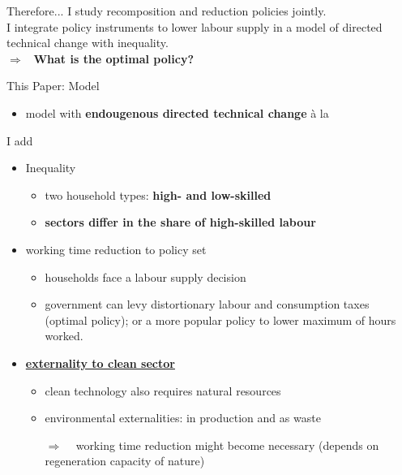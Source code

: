 \documentclass[11pt,aspectratio=169]{beamer}
\newcommand{\tr}[1]{\textcolor{blue}{#1}}
\newcommand{\ar}{$\Rightarrow$ \ }
\begin{document}
\begin{frame}
	\begin{block}{Therefore...}
I study recomposition and reduction policies jointly. 
\\
I integrate policy instruments to lower labour supply in a model of directed technical change with  inequality. \\
\vspace{2mm}
\ar \textbf{What is the optimal policy?}
	\end{block}

\end{frame}

\begin{frame}{This Paper: Model}
	\begin{itemize}
\item model with \textbf{\alert{endougenous directed technical change}}  à la \cite{Acemoglu2012TheChange}
\end{itemize}
I add 
\begin{itemize}
\item Inequality
\begin{itemize}
\item two household types: \textbf{\alert{high- and low-skilled}}
\item \alert{\textbf{sectors differ in the share of high-skilled labour }}
\end{itemize}
\item working time reduction to policy set
\begin{itemize}
\item households face a labour supply decision
\item government can levy distortionary labour and consumption taxes (optimal policy); or a more popular policy to lower maximum of hours worked.
\end{itemize}

\item %
 \hyperlink{cleanSec}{\textbf{\alert{externality to clean sector}} }
\begin{itemize}
	\item clean technology also requires natural resources
	\item environmental externalities: in production and as waste
	\item[\ar] working time reduction might become necessary (depends on regeneration capacity of nature)
\end{itemize}
	\end{itemize}
\end{frame}
\end{document}
